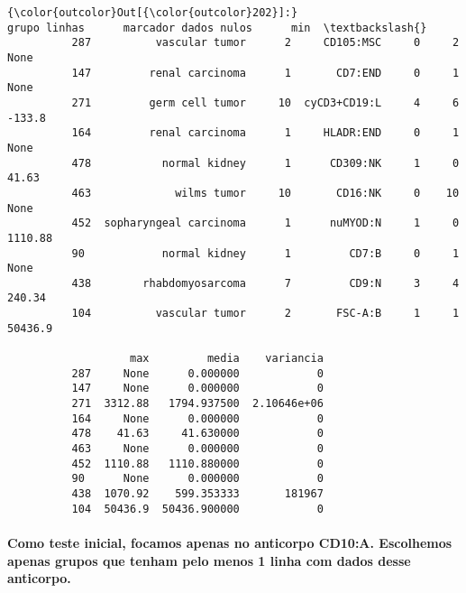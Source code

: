 \documentclass[11pt]{article}
\begin{document}
\begin{Verbatim}[commandchars=\\\{\}]
{\color{outcolor}Out[{\color{outcolor}202}]:}                       grupo linhas      marcador dados nulos      min  \textbackslash{}
          287          vascular tumor      2     CD105:MSC     0     2     None   
          147         renal carcinoma      1       CD7:END     0     1     None   
          271         germ cell tumor     10  cyCD3+CD19:L     4     6   -133.8   
          164         renal carcinoma      1     HLADR:END     0     1     None   
          478           normal kidney      1      CD309:NK     1     0    41.63   
          463             wilms tumor     10       CD16:NK     0    10     None   
          452  sopharyngeal carcinoma      1      nuMYOD:N     1     0  1110.88   
          90            normal kidney      1         CD7:B     0     1     None   
          438        rhabdomyosarcoma      7         CD9:N     3     4   240.34   
          104          vascular tumor      2       FSC-A:B     1     1  50436.9   
          
                   max         media    variancia  
          287     None      0.000000            0  
          147     None      0.000000            0  
          271  3312.88   1794.937500  2.10646e+06  
          164     None      0.000000            0  
          478    41.63     41.630000            0  
          463     None      0.000000            0  
          452  1110.88   1110.880000            0  
          90      None      0.000000            0  
          438  1070.92    599.353333       181967  
          104  50436.9  50436.900000            0  
\end{Verbatim}
            
    \paragraph{Como teste inicial, focamos apenas no anticorpo CD10:A.
Escolhemos apenas grupos que tenham pelo menos 1 linha com dados desse
anticorpo.}\label{como-teste-inicial-focamos-apenas-no-anticorpo-cd10a.-escolhemos-apenas-grupos-que-tenham-pelo-menos-1-linha-com-dados-desse-anticorpo.}
\end{document}
